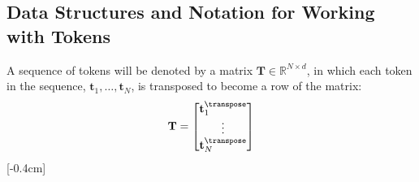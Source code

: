 
\subsection{Data Structures and Notation for Working with Tokens}

A sequence of tokens will be denoted by a matrix $\mathbf{T} \in \mathbb{R}^{N \times d}$, in which each token in the sequence, $\mathbf{t}_1, \ldots, \mathbf{t}_N$, is transposed to become a row of the matrix:
\begin{equation}
  \mathbf{T} = 
  \begin{bmatrix}
    \mathbf{t}_1^\transpose \\
    \vdots \\
    \mathbf{t}_N^\transpose \\
  \end{bmatrix}
\end{equation}
[-0.4cm]

